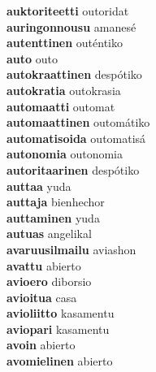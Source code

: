 \textbf{auktoriteetti } outoridat \\
\textbf{auringonnousu } amanesé \\
\textbf{autenttinen } outéntiko \\
\textbf{auto } outo \\
\textbf{autokraattinen } despótiko \\
\textbf{autokratia } outokrasia \\
\textbf{automaatti } outomat \\
\textbf{automaattinen } outomátiko \\
\textbf{automatisoida } outomatisá \\
\textbf{autonomia } outonomia \\
\textbf{autoritaarinen } despótiko \\
\textbf{auttaa } yuda \\
\textbf{auttaja } bienhechor \\
\textbf{auttaminen } yuda \\
\textbf{autuas } angelikal \\
\textbf{avaruusilmailu } aviashon \\
\textbf{avattu } abierto \\
\textbf{avioero } diborsio \\
\textbf{avioitua } casa \\
\textbf{avioliitto } kasamentu \\
\textbf{aviopari } kasamentu \\
\textbf{avoin } abierto \\
\textbf{avomielinen } abierto \\
